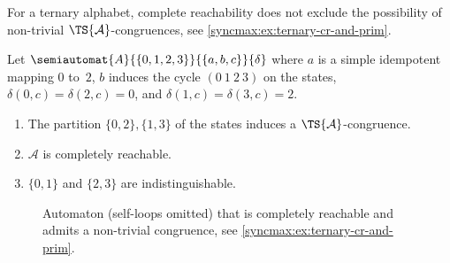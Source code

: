 For a ternary alphabet, complete reachability does not exclude the possibility
of non-trivial $\TS{\mathcal A}$-congruences, see \cref{syncmax:ex:ternary-cr-and-prim}.

\begin{example} \label{syncmax:ex:ternary-cr-and-prim}
	Let $\semiautomat{A}{\{0,1,2,3\}}{\{a,b,c\}}{\delta}$
	where $a$ is a simple idempotent mapping $0$ to~$2$,
	$b$ induces the cycle $(0 ~ 1 ~ 2 ~ 3)$ on the states,
	$\delta(0, c) = \delta(2, c) = 0$, and $\delta(1, c) = \delta(3, c) = 2$.
	
	\begin{enumerate}
		\item The partition $\{0,2\}, \{1,3\}$ of the states induces a $\TS{\mathcal A}$-congruence.
		
		\item $\mathcal A$ is completely reachable.
		
		\item $\{0,1\}$	and $\{2,3\}$ are indistinguishable.
	\end{enumerate} 
	
	\begin{figure}[htb]
		\centering
		\caption[Ternary completely reachable automaton with non-trivial congruence]{Automaton 
			(self-loops omitted) that is completely reachable and admits a non-trivial congruence, see \cref{syncmax:ex:ternary-cr-and-prim}.}
		\label{sync_max:fig:ternary-cr-and-prim}
	\end{figure}
\end{example}

